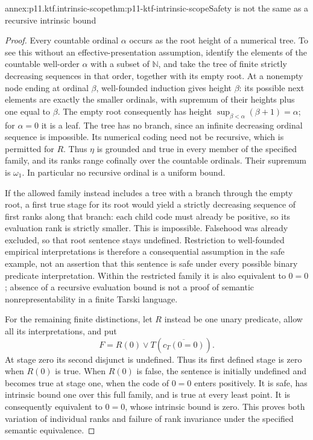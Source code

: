 \begin{annexitem}{annex:p11.ktf.intrinsic-scope}{thm:p11-ktf-intrinsic-scope}{Safety is not the same as a recursive intrinsic bound}
\begin{proof}
Every countable ordinal \(\alpha\) occurs as the root height
of a numerical tree. To see this without an effective-presentation
assumption, identify the elements of the countable well-order
\(\alpha\) with a subset of \(\mathbb N\), and take the
tree of finite strictly decreasing sequences in that order, together
with its empty root. At a nonempty node ending at ordinal
\(\beta\), well-founded induction gives height \(\beta\):
its possible next elements are exactly the smaller ordinals, with
supremum of their heights plus one equal to \(\beta\).
The empty root consequently has height
\(\sup_{\beta<\alpha}(\beta+1)=\alpha\); for
\(\alpha=0\) it is a leaf. The tree has no branch, since an
infinite decreasing ordinal sequence is impossible. Its numerical
coding need not be recursive, which is permitted for \(R\).
Thus \(\eta\) is grounded and true in every member of the
specified family, and its ranks range cofinally over the countable
ordinals. Their supremum is \(\omega_1\). In particular no
recursive ordinal is a uniform bound.

If the allowed family instead includes a tree with a branch through
the empty root, a first true stage for its root would yield a strictly
decreasing sequence of first ranks along that branch: each child code
must already be positive, so its evaluation rank is strictly smaller.
This is impossible. Falsehood was already excluded, so that root
sentence stays undefined. Restriction to well-founded empirical
interpretations is therefore a consequential assumption in the safe
example, not an assertion that this sentence is safe under every
possible binary predicate interpretation. Within the restricted
family it is also equivalent to \(0=0\); absence of a recursive
evaluation bound is not a proof of semantic nonrepresentability
in a finite Tarski language.

For the remaining finite distinctions, let \(R\) instead be one
unary predicate, allow all its interpretations, and put
\[
 F=R(0)\lor T(\overline{c_T(0=0)}).
\]
At stage zero its second disjunct is undefined. Thus its first
defined stage is zero when \(R(0)\) is true. When \(R(0)\)
is false, the sentence is initially undefined and becomes true
at stage one, when the code of \(0=0\) enters positively.
It is safe, has intrinsic bound one over this full family, and
is true at every least point. It is consequently equivalent to
\(0=0\), whose intrinsic bound is zero. This proves both
variation of individual ranks and failure of rank invariance
under the specified semantic equivalence.
\end{proof}
\end{annexitem}

